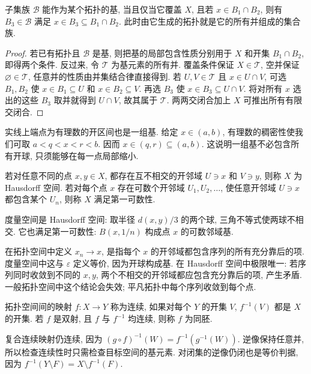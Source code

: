 \begin{proposition}\label{thm:basis-criterion}
子集族 $\mathcal B$ 能作为某个拓扑的基, 当且仅当它覆盖 $X$, 且若 $x\in B_1\cap B_2$, 则有 $B_3\in\mathcal B$ 满足 $x\in B_3\subseteq B_1\cap B_2$. 此时由它生成的拓扑就是它的所有并组成的集合族.
\end{proposition}
\begin{proof}
若已有拓扑且 $\mathcal B$ 是基, 则把基的局部包含性质分别用于 $X$ 和开集 $B_1\cap B_2$, 即得两个条件. 反过来, 令 $\mathcal T$ 为基元素的所有并. 覆盖条件保证 $X\in\mathcal T$, 空并保证 $\varnothing\in\mathcal T$, 任意并的性质由并集结合律直接得到. 若 $U,V\in\mathcal T$ 且 $x\in U\cap V$, 可选 $B_1,B_2$ 使 $x\in B_1\subseteq U$ 和 $x\in B_2\subseteq V$. 再选 $B_3$ 使 $x\in B_3\subseteq U\cap V$. 将对所有 $x$ 选出的这些 $B_3$ 取并就得到 $U\cap V$, 故其属于 $\mathcal T$. 两两交闭合加上 $X$ 可推出所有有限交闭合.
\end{proof}

实线上端点为有理数的开区间也是一组基. 给定 $x\in(a,b)$, 有理数的稠密性使我们可取 $a<q<x<r<b$. 因而 $x\in(q,r)\subseteq(a,b)$. 这说明一组基不必包含所有开球, 只须能够在每一点局部缩小.

\begin{definition}
若对任意不同的点 $x,y\in X$, 都存在互不相交的开邻域 $U\ni x$ 和 $V\ni y$, 则称 $X$ 为 Hausdorff 空间. 若对每个点 $x$ 存在可数个开邻域 $U_1,U_2,\ldots$, 使任意开邻域 $U\ni x$ 都包含某个 $U_n$, 则称 $X$ 满足第一可数性.
\end{definition}
度量空间是 Hausdorff 空间: 取半径 $d(x,y)/3$ 的两个球, 三角不等式使两球不相交. 它也满足第一可数性: $B(x,1/n)$ 构成点 $x$ 的可数邻域基.

在拓扑空间中定义 $x_n\to x$, 是指每个 $x$ 的开邻域都包含序列的所有充分靠后的项. 度量空间中这与 $\varepsilon$ 定义等价, 因为开球构成基. 在 Hausdorff 空间中极限唯一: 若序列同时收敛到不同的 $x,y$, 两个不相交的开邻域都应包含充分靠后的项, 产生矛盾. 一般拓扑空间中这个结论会失效; 平凡拓扑中每个序列收敛到每个点.

\begin{definition}
拓扑空间间的映射 $f:X\to Y$ 称为连续, 如果对每个 $Y$ 的开集 $V$, $f^{-1}(V)$ 都是 $X$ 的开集. 若 $f$ 是双射, 且 $f$ 与 $f^{-1}$ 均连续, 则称 $f$ 为同胚.
\end{definition}
复合连续映射仍连续, 因为 $(g\circ f)^{-1}(W)=f^{-1}(g^{-1}(W))$. 逆像保持任意并, 所以检查连续性时只需检查目标空间的基元素. 对闭集的逆像仍闭也是等价判据, 因为 $f^{-1}(Y\setminus F)=X\setminus f^{-1}(F)$.

